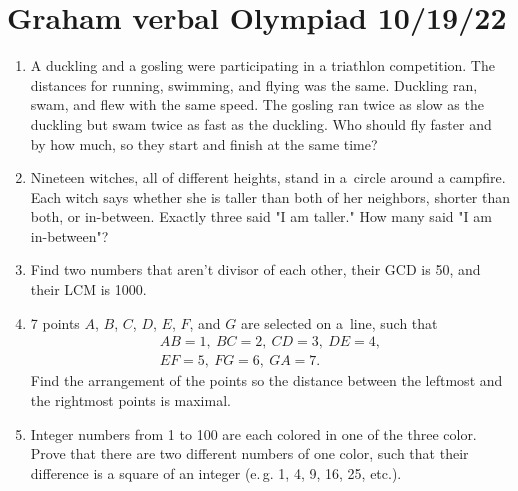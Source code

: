 \documentclass[12pt]{article}
\begin{document}
  \section*{Graham verbal Olympiad 10/19/22}
  \begin{enumerate}[leftmargin=6mm]
    \item A duckling and a gosling were participating in a triath\-lon competition. The
    distances for running, swimming, and flying was the same. Duckling ran, swam, and flew with the same speed. The gosling ran twice as slow as the duckling
    but swam twice as fast as the duckling. Who should fly faster and by how much, so they start and finish at the same time?
    
    \item Nineteen witches, all of different heights, stand in a~circle around a campfire.
    Each witch says whether she is taller than both of her neighbors, shorter than both,
    or in-between. Exactly three said "I am taller." How many said "I am in-between"?

    \item Find two numbers that aren't divisor of each other, their GCD is 50, and their LCM is 1000.

    \item 7 points $A$, $B$, $C$, $D$, $E$, $F$, and $G$ are selected on a~line, such that
    \begin{gather*}
      AB = 1,\ BC = 2,\ CD = 3,\ DE = 4,\\ 
      EF = 5,\ FG = 6,\ GA = 7.
    \end{gather*} 
    Find the arrangement of the points so the distance between the leftmost and the rightmost points is maximal.
    
    \item Integer numbers from 1 to 100 are each colored in one of the three color. Prove that there are two different numbers of one color, such that their difference is a square of an integer (e.\,g. 1, 4, 9, 16, 25, etc.).
  \end{enumerate}
\end{document}

